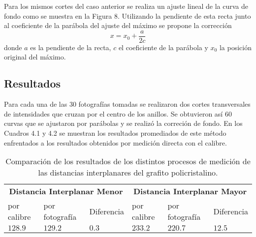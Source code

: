 \documentclass[a4paper, 10pt, spanish]{article}
\numberwithin{equation}{section}
\numberwithin{table}{section}
\begin{document}
Para los mismos cortes del caso anterior se realiza un ajuste lineal de la curva de fondo como se muestra en la Figura 8. Utilizando la pendiente de esta recta junto al coeficiente de la parábola del ajuste del máximo se propone la corrección
\begin{equation}
x = x_0 + \frac{a}{2c}
\end{equation}
donde $a$ es la pendiente de la recta, $c$ el coeficiente de la parábola y $x_0$ la posición original del máximo. 

\subsection{Resultados}
Para cada una de las 30 fotografías tomadas se realizaron dos cortes transversales de intensidades que cruzan por el centro de los anillos. Se obtuvieron así 60 curvas que se ajustaron por parábolas y se realizó la correción de fondo. En los Cuadros 4.1 y 4.2 se muestran los resultados promediados de este método enfrentados a los resultados obtenidos por medición directa con el calibre.

\begin{table}[ht]
\centering
\begin{tabularx}{0.94\textwidth}{XXXXXX}
\toprule   
 \multicolumn{3}{c}{\textbf{Distancia Interplanar Menor}}  & \multicolumn{3}{c}{\textbf{Distancia Interplanar Mayor}}  \\
 \cmidrule(r){1-3}  \cmidrule(r){4-6} 
  por calibre           & por fotografía  & Diferencia      & por calibre   & por fotografía  &Diferencia     \\ 
\cmidrule(r){1-1}     \cmidrule(r){2-2}     \cmidrule(r){3-3} \cmidrule(r){4-4}  \cmidrule(r){5-5} \cmidrule(r){6-6}  
 $128.9 $& $129.2$  & $0.3$                             & $233.2$          &  $220.7$ & $12.5$                               \\  \hline
\bottomrule
\end{tabularx}
\caption{Comparación de los resultados de los distintos procesos de medición de las distancias interplanares del grafito policristalino.} 
\label{tab:sim_b_2}
\end{table}
\end{document}
